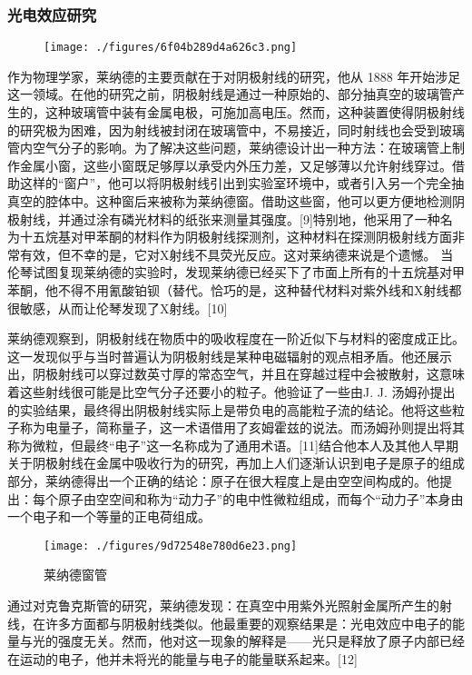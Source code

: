 \subsubsection{光电效应研究}
\begin{figure}[ht]
\centering
\texttt{[image: ./figures/6f04b289d4a626c3.png]}
\caption{} \label{fig_FLPL_1}
\end{figure}
作为物理学家，莱纳德的主要贡献在于对阴极射线的研究，他从 1888 年开始涉足这一领域。在他的研究之前，阴极射线是通过一种原始的、部分抽真空的玻璃管产生的，这种玻璃管中装有金属电极，可施加高电压。然而，这种装置使得阴极射线的研究极为困难，因为射线被封闭在玻璃管中，不易接近，同时射线也会受到玻璃管内空气分子的影响。为了解决这些问题，莱纳德设计出一种方法：在玻璃管上制作金属小窗，这些小窗既足够厚以承受内外压力差，又足够薄以允许射线穿过。借助这样的“窗户”，他可以将阴极射线引出到实验室环境中，或者引入另一个完全抽真空的腔体中。这种窗后来被称为莱纳德窗。借助这些窗，他可以更方便地检测阴极射线，并通过涂有磷光材料的纸张来测量其强度。[9]特别地，他采用了一种名为十五烷基对甲苯酮的材料作为阴极射线探测剂，这种材料在探测阴极射线方面非常有效，但不幸的是，它对X射线不具荧光反应。这对莱纳德来说是个遗憾。
当伦琴试图复现莱纳德的实验时，发现莱纳德已经买下了市面上所有的十五烷基对甲苯酮，他不得不用氰酸铂钡（替代。恰巧的是，这种替代材料对紫外线和X射线都很敏感，从而让伦琴发现了X射线。[10]

莱纳德观察到，阴极射线在物质中的吸收程度在一阶近似下与材料的密度成正比。这一发现似乎与当时普遍认为阴极射线是某种电磁辐射的观点相矛盾。他还展示出，阴极射线可以穿过数英寸厚的常态空气，并且在穿越过程中会被散射，这意味着这些射线很可能是比空气分子还要小的粒子。他验证了一些由J. J. 汤姆孙提出的实验结果，最终得出阴极射线实际上是带负电的高能粒子流的结论。他将这些粒子称为电量子，简称量子，这一术语借用了亥姆霍兹的说法。而汤姆孙则提出将其称为微粒，但最终“电子”这一名称成为了通用术语。[11]结合他本人及其他人早期关于阴极射线在金属中吸收行为的研究，再加上人们逐渐认识到电子是原子的组成部分，莱纳德得出一个正确的结论：原子在很大程度上是由空空间构成的。他提出：每个原子由空空间和称为“动力子”的电中性微粒组成，而每个“动力子”本身由一个电子和一个等量的正电荷组成。
\begin{figure}[ht]
\centering
\texttt{[image: ./figures/9d72548e780d6e23.png]}
\caption{莱纳德窗管} \label{fig_FLPL_2}
\end{figure}
通过对克鲁克斯管的研究，莱纳德发现：在真空中用紫外光照射金属所产生的射线，在许多方面都与阴极射线类似。他最重要的观察结果是：光电效应中电子的能量与光的强度无关。然而，他对这一现象的解释是——光只是释放了原子内部已经在运动的电子，他并未将光的能量与电子的能量联系起来。[12]

